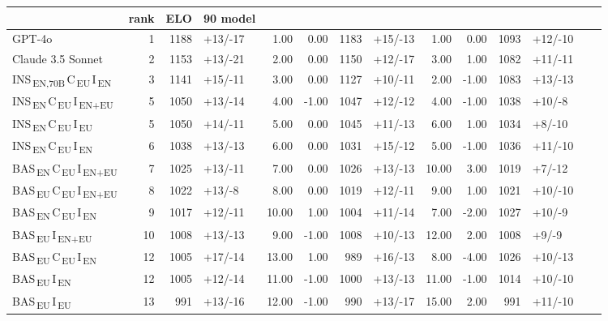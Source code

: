 \begin{tabular}{lrrlrrrlrrrl}
\toprule
 & rank & ELO & 90%
model &  &  &  &  &  &  &  &  &  &  &  \\
\midrule
GPT-4o & 1 & 1188 & +13/-17 & 1.00 & 0.00 & 1183 & +15/-13 & 1.00 & 0.00 & 1093 & +12/-10 \\
Claude 3.5 Sonnet & 2 & 1153 & +13/-21 & 2.00 & 0.00 & 1150 & +12/-17 & 3.00 & 1.00 & 1082 & +11/-11 \\
INS\textsubscript{\,EN,70B}\,C\textsubscript{\,EU}\,I\textsubscript{\,EN} & 3 & 1141 & +15/-11 & 3.00 & 0.00 & 1127 & +10/-11 & 2.00 & -1.00 & 1083 & +13/-13 \\
INS\textsubscript{\,EN}\,C\textsubscript{\,EU}\,I\textsubscript{\,EN+EU} & 5 & 1050 & +13/-14 & 4.00 & -1.00 & 1047 & +12/-12 & 4.00 & -1.00 & 1038 & +10/-8 \\
INS\textsubscript{\,EN}\,C\textsubscript{\,EU}\,I\textsubscript{\,EU} & 5 & 1050 & +14/-11 & 5.00 & 0.00 & 1045 & +11/-13 & 6.00 & 1.00 & 1034 & +8/-10 \\
INS\textsubscript{\,EN}\,C\textsubscript{\,EU}\,I\textsubscript{\,EN} & 6 & 1038 & +13/-13 & 6.00 & 0.00 & 1031 & +15/-12 & 5.00 & -1.00 & 1036 & +11/-10 \\
BAS\textsubscript{\,EN}\,C\textsubscript{\,EU}\,I\textsubscript{\,EN+EU} & 7 & 1025 & +13/-11 & 7.00 & 0.00 & 1026 & +13/-13 & 10.00 & 3.00 & 1019 & +7/-12 \\
BAS\textsubscript{\,EU}\,C\textsubscript{\,EU}\,I\textsubscript{\,EN+EU} & 8 & 1022 & +13/-8 & 8.00 & 0.00 & 1019 & +12/-11 & 9.00 & 1.00 & 1021 & +10/-10 \\
BAS\textsubscript{\,EN}\,C\textsubscript{\,EU}\,I\textsubscript{\,EN} & 9 & 1017 & +12/-11 & 10.00 & 1.00 & 1004 & +11/-14 & 7.00 & -2.00 & 1027 & +10/-9 \\
BAS\textsubscript{\,EU}\,I\textsubscript{\,EN+EU} & 10 & 1008 & +13/-13 & 9.00 & -1.00 & 1008 & +10/-13 & 12.00 & 2.00 & 1008 & +9/-9 \\
BAS\textsubscript{\,EU}\,C\textsubscript{\,EU}\,I\textsubscript{\,EN} & 12 & 1005 & +17/-14 & 13.00 & 1.00 & 989 & +16/-13 & 8.00 & -4.00 & 1026 & +10/-13 \\
BAS\textsubscript{\,EU}\,I\textsubscript{\,EN} & 12 & 1005 & +12/-14 & 11.00 & -1.00 & 1000 & +13/-13 & 11.00 & -1.00 & 1014 & +10/-10 \\
BAS\textsubscript{\,EU}\,I\textsubscript{\,EU} & 13 & 991 & +13/-16 & 12.00 & -1.00 & 990 & +13/-17 & 15.00 & 2.00 & 991 & +11/-10 \\

\end{tabular}
